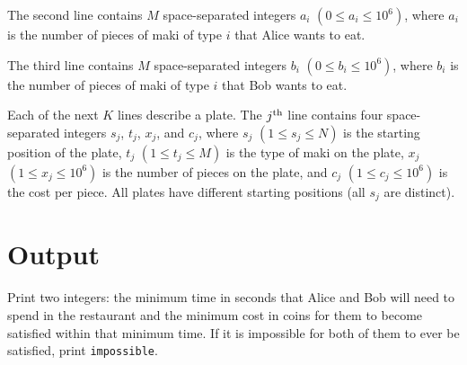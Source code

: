 The second line contains $M$ space-separated integers $a_i$ $(0 \leq a_i \leq 10^6)$, where
$a_i$ is the number of pieces of maki of type $i$ that Alice wants to eat.

The third line contains $M$ space-separated integers $b_i$ $(0 \leq b_i \leq 10^6)$, where
$b_i$ is the number of pieces of maki of type $i$ that Bob wants to eat.

Each of the next $K$ lines describe a plate. The $j\textsuperscript{th}$ line
contains four space-separated integers $s_j$, $t_j$, $x_j$, and $c_j$, where
$s_j$ $(1 \leq s_j \leq N)$ is the starting position of the plate,
$t_j$ $(1 \leq t_j \leq M)$ is the type of maki on the plate,
$x_j$ $(1 \leq x_j \leq 10^6)$ is the number of pieces on the plate, and
$c_j$ $(1 \leq c_j \leq 10^6)$ is the cost per piece.
All plates have different starting positions (all $s_j$ are distinct).

\section*{Output}
Print two integers: the minimum time in seconds that Alice and Bob will need to spend in the restaurant and the minimum cost in coins for them to become satisfied within that minimum time.
If it is impossible for both of them to ever be satisfied, print \texttt{impossible}.


